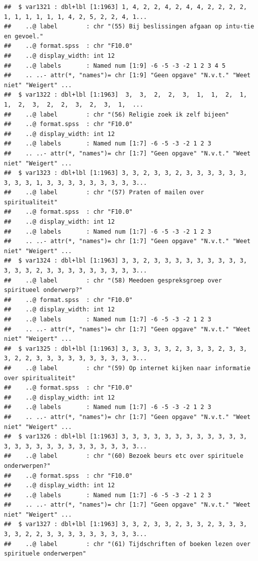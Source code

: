 \documentclass[
]{book}
\begin{document}
\begin{verbatim}
##  $ var1321 : dbl+lbl [1:1963] 1, 4, 2, 2, 4, 2, 4, 4, 2, 2, 2, 2, 1, 1, 1, 1, 1, 1, 4, 2, 5, 2, 2, 4, 1...
##    ..@ label        : chr "(55) Bij beslissingen afgaan op intu‹tie en gevoel."
##    ..@ format.spss  : chr "F10.0"
##    ..@ display_width: int 12
##    ..@ labels       : Named num [1:9] -6 -5 -3 -2 1 2 3 4 5
##    .. ..- attr(*, "names")= chr [1:9] "Geen opgave" "N.v.t." "Weet niet" "Weigert" ...
##  $ var1322 : dbl+lbl [1:1963]  3,  3,  2,  2,  3,  1,  1,  2,  1,  1,  2,  3,  2,  2,  3,  2,  3,  1,  ...
##    ..@ label        : chr "(56) Religie zoek ik zelf bijeen"
##    ..@ format.spss  : chr "F10.0"
##    ..@ display_width: int 12
##    ..@ labels       : Named num [1:7] -6 -5 -3 -2 1 2 3
##    .. ..- attr(*, "names")= chr [1:7] "Geen opgave" "N.v.t." "Weet niet" "Weigert" ...
##  $ var1323 : dbl+lbl [1:1963] 3, 3, 2, 3, 3, 2, 3, 3, 3, 3, 3, 3, 3, 3, 3, 1, 3, 3, 3, 3, 3, 3, 3, 3, 3...
##    ..@ label        : chr "(57) Praten of mailen over spiritualiteit"
##    ..@ format.spss  : chr "F10.0"
##    ..@ display_width: int 12
##    ..@ labels       : Named num [1:7] -6 -5 -3 -2 1 2 3
##    .. ..- attr(*, "names")= chr [1:7] "Geen opgave" "N.v.t." "Weet niet" "Weigert" ...
##  $ var1324 : dbl+lbl [1:1963] 3, 3, 2, 3, 3, 3, 3, 3, 3, 3, 3, 3, 3, 3, 3, 2, 3, 3, 3, 3, 3, 3, 3, 3, 3...
##    ..@ label        : chr "(58) Meedoen gespreksgroep over spiritueel onderwerp?"
##    ..@ format.spss  : chr "F10.0"
##    ..@ display_width: int 12
##    ..@ labels       : Named num [1:7] -6 -5 -3 -2 1 2 3
##    .. ..- attr(*, "names")= chr [1:7] "Geen opgave" "N.v.t." "Weet niet" "Weigert" ...
##  $ var1325 : dbl+lbl [1:1963] 3, 3, 3, 3, 3, 2, 3, 3, 3, 2, 3, 3, 3, 2, 2, 3, 3, 3, 3, 3, 3, 3, 3, 3, 3...
##    ..@ label        : chr "(59) Op internet kijken naar informatie over spiritualiteit"
##    ..@ format.spss  : chr "F10.0"
##    ..@ display_width: int 12
##    ..@ labels       : Named num [1:7] -6 -5 -3 -2 1 2 3
##    .. ..- attr(*, "names")= chr [1:7] "Geen opgave" "N.v.t." "Weet niet" "Weigert" ...
##  $ var1326 : dbl+lbl [1:1963] 3, 3, 3, 3, 3, 3, 3, 3, 3, 3, 3, 3, 3, 3, 3, 3, 3, 3, 3, 3, 3, 3, 3, 3, 3...
##    ..@ label        : chr "(60) Bezoek beurs etc over spirituele onderwerpen?"
##    ..@ format.spss  : chr "F10.0"
##    ..@ display_width: int 12
##    ..@ labels       : Named num [1:7] -6 -5 -3 -2 1 2 3
##    .. ..- attr(*, "names")= chr [1:7] "Geen opgave" "N.v.t." "Weet niet" "Weigert" ...
##  $ var1327 : dbl+lbl [1:1963] 3, 3, 2, 3, 3, 2, 3, 3, 2, 3, 3, 3, 3, 3, 2, 2, 3, 3, 3, 3, 3, 3, 3, 3, 3...
##    ..@ label        : chr "(61) Tijdschriften of boeken lezen over spirituele onderwerpen"

\end{verbatim}
\end{document}
